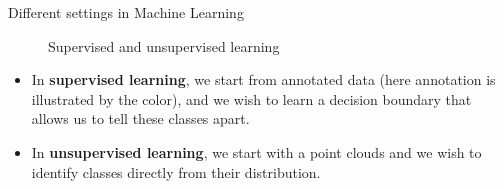 \documentclass[xcolor=pdftex,dvipsnames,table]{beamer}
\begin{document}
\begin{frame}{Different settings in Machine Learning}
	 \begin{figure}[htb]
   		\centering
   		 \hspace{1cm}
   		\caption{Supervised and unsupervised learning}
	 \end{figure}
	\begin{itemize}
		\item In {\bf supervised learning}, we start from annotated data (here annotation is illustrated by the color), and we wish to learn a decision boundary that allows us to tell these classes apart.
		\item In {\bf unsupervised learning}, we start with a point clouds and we wish to identify classes directly from their distribution. 
	\end{itemize}
\end{frame}
\end{document}
